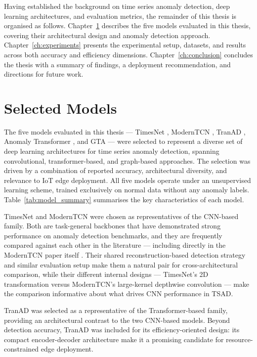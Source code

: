 \documentclass[twoside,11pt,openright]{report}
\begin{document}
Having established the background on time series anomaly detection, deep learning architectures, 
and evaluation metrics, the remainder of this thesis is organised as follows. 
Chapter~\ref{ch:selected_models} describes the five models evaluated in this thesis, 
covering their architectural design and anomaly detection approach. Chapter~\ref{ch:experiments} 
presents the experimental setup, datasets, and results across both accuracy and efficiency dimensions. 
Chapter~\ref{ch:conclusion} concludes the thesis with a summary of findings, a deployment recommendation, 
and directions for future work.

\chapter{Selected Models}
\label{ch:selected_models}

The five models evaluated in this thesis --- TimesNet \citep{timesnet2023} , ModernTCN \citep{moderntcn2024} , TranAD \citep{tranad2022}, 
Anomaly Transformer \citep{anomalytransformer2022} , and GTA \citep{gta2022} 
--- were selected to represent a diverse set of deep learning 
architectures for time series anomaly detection, spanning convolutional, transformer-based, 
and graph-based approaches. The selection was driven by a combination of reported accuracy, 
architectural diversity, and relevance to IoT edge deployment. All five models operate under 
an unsupervised learning scheme, trained 
exclusively on normal data without any anomaly labels. Table~\ref{tab:model_summary} 
summarises the key characteristics of each model.

TimesNet \citep{timesnet2023} and ModernTCN \citep{moderntcn2024} were chosen as 
representatives of the CNN-based family. Both are task-general backbones that have 
demonstrated strong performance on anomaly detection benchmarks, and they are frequently 
compared against each other in the literature --- including directly in the ModernTCN 
paper itself \citep{moderntcn2024}. Their shared reconstruction-based detection strategy 
and similar evaluation setup make them a natural pair for cross-architectural comparison, 
while their different internal designs --- TimesNet's 2D transformation versus ModernTCN's 
large-kernel depthwise convolution --- make the comparison informative about what drives 
CNN performance in TSAD.

TranAD \citep{tranad2022} was selected as a representative of the Transformer-based
family, providing an architectural contrast to the two CNN-based models. Beyond
detection accuracy, TranAD was included for its efficiency-oriented design: its
compact encoder-decoder architecture make it a promising
candidate for resource-constrained edge deployment.
\end{document}
